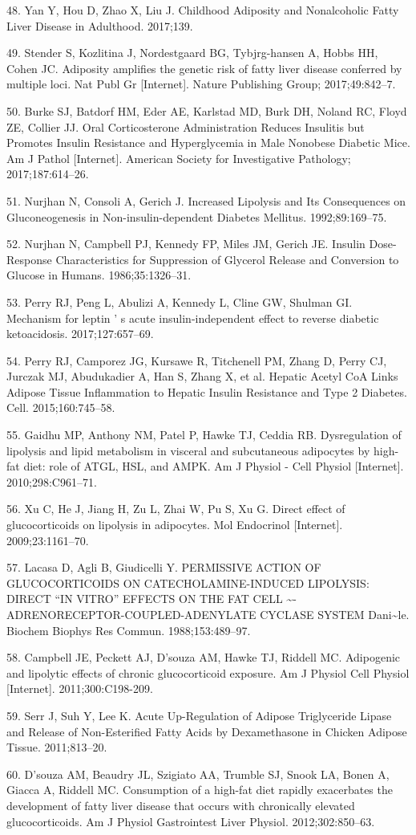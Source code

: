 \documentclass[11pt]{article} %
\begin{document}
48. Yan Y, Hou D, Zhao X, Liu J. Childhood Adiposity and Nonalcoholic
Fatty Liver Disease in Adulthood. 2017;139.

49. Stender S, Kozlitina J, Nordestgaard BG, Tybjrg-hansen A, Hobbs HH,
Cohen JC. Adiposity amplifies the genetic risk of fatty liver disease
conferred by multiple loci. Nat Publ Gr {[}Internet{]}. Nature
Publishing Group; 2017;49:842--7. 

50. Burke SJ, Batdorf HM, Eder AE, Karlstad MD, Burk DH, Noland RC,
Floyd ZE, Collier JJ. Oral Corticosterone Administration Reduces
Insulitis but Promotes Insulin Resistance and Hyperglycemia in Male
Nonobese Diabetic Mice. Am J Pathol {[}Internet{]}. American Society for
Investigative Pathology; 2017;187:614--26. 

51. Nurjhan N, Consoli A, Gerich J. Increased Lipolysis and Its
Consequences on Gluconeogenesis in Non-insulin-dependent Diabetes
Mellitus. 1992;89:169--75.

52. Nurjhan N, Campbell PJ, Kennedy FP, Miles JM, Gerich JE. Insulin
Dose-Response Characteristics for Suppression of Glycerol Release and
Conversion to Glucose in Humans. 1986;35:1326--31.

53. Perry RJ, Peng L, Abulizi A, Kennedy L, Cline GW, Shulman GI.
Mechanism for leptin ' s acute insulin-independent effect to reverse
diabetic ketoacidosis. 2017;127:657--69.

54. Perry RJ, Camporez JG, Kursawe R, Titchenell PM, Zhang D, Perry CJ,
Jurczak MJ, Abudukadier A, Han S, Zhang X, et al. Hepatic Acetyl CoA
Links Adipose Tissue Inflammation to Hepatic Insulin Resistance and Type
2 Diabetes. Cell. 2015;160:745--58.

55. Gaidhu MP, Anthony NM, Patel P, Hawke TJ, Ceddia RB. Dysregulation
of lipolysis and lipid metabolism in visceral and subcutaneous
adipocytes by high-fat diet: role of ATGL, HSL, and AMPK. Am J Physiol -
Cell Physiol {[}Internet{]}. 2010;298:C961--71. 

56. Xu C, He J, Jiang H, Zu L, Zhai W, Pu S, Xu G. Direct effect of
glucocorticoids on lipolysis in adipocytes. Mol Endocrinol
{[}Internet{]}. 2009;23:1161--70. 

57. Lacasa D, Agli B, Giudicelli Y. PERMISSIVE ACTION OF GLUCOCORTICOIDS
ON CATECHOLAMINE-INDUCED LIPOLYSIS: DIRECT ``IN VITRO'' EFFECTS ON THE
FAT CELL \textasciitilde{}-ADRENORECEPTOR-COUPLED-ADENYLATE CYCLASE
SYSTEM Dani\textasciitilde{}le. Biochem Biophys Res Commun.
1988;153:489--97.

58. Campbell JE, Peckett AJ, D'souza AM, Hawke TJ, Riddell MC.
Adipogenic and lipolytic effects of chronic glucocorticoid exposure. Am
J Physiol Cell Physiol {[}Internet{]}. 2011;300:C198-209. 

59. Serr J, Suh Y, Lee K. Acute Up-Regulation of Adipose Triglyceride
Lipase and Release of Non-Esterified Fatty Acids by Dexamethasone in
Chicken Adipose Tissue. 2011;813--20.

60. D'souza AM, Beaudry JL, Szigiato AA, Trumble SJ, Snook LA, Bonen A,
Giacca A, Riddell MC. Consumption of a high-fat diet rapidly exacerbates
the development of fatty liver disease that occurs with chronically
elevated glucocorticoids. Am J Physiol Gastrointest Liver Physiol.
2012;302:850--63.
\end{document}
